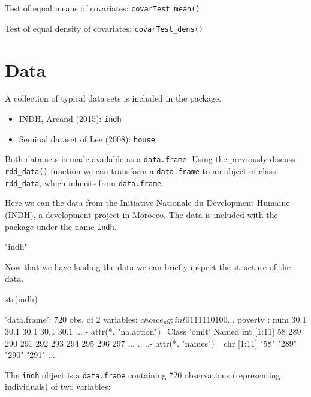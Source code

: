 \documentclass[article]{jss}
\begin{document}
Test of equal means of covariates: \texttt{covarTest\_mean()}

Test of equal density of covariates: \texttt{covarTest\_dens()}

\section{Data}\label{data}

A collection of typical data sets is included in the package.

\begin{itemize}
\itemsep1pt\parskip0pt
\item
  INDH, Arcand (2015): \texttt{indh}
\item
  Seminal dataset of Lee (2008): \texttt{house}
\end{itemize}

Both data sets is made available as a \texttt{data.frame}. Using the
previously discuss \texttt{rdd\_data()} function we can transform a
\texttt{data.frame} to an object of class \texttt{rdd\_data}, which
inherits from \texttt{data.frame}.

Here we can the data from the Initiative Nationale du Development
Humaine (INDH), a development project in Morocco. The data is included
with the package under the name \texttt{indh}.

\begin{CodeChunk}
\begin{CodeOutput}
[1] "indh"
\end{CodeOutput}
\end{CodeChunk}

Now that we have loading the data we can briefly inspect the structure
of the data.

\begin{CodeChunk}
\begin{CodeInput}
str(indh)
\end{CodeInput}
\begin{CodeOutput}
'data.frame':   720 obs. of  2 variables:
 $ choice_pg: int  0 1 1 1 1 1 0 1 0 0 ...
 $ poverty  : num  30.1 30.1 30.1 30.1 30.1 ...
 - attr(*, "na.action")=Class 'omit'  Named int [1:11] 58 289 290 291 292 293 294 295 296 297 ...
  .. ..- attr(*, "names")= chr [1:11] "58" "289" "290" "291" ...
\end{CodeOutput}
\end{CodeChunk}

The \texttt{indh} object is a \texttt{data.frame} containing 720
observations (representing individuals) of two variables:
\end{document}
